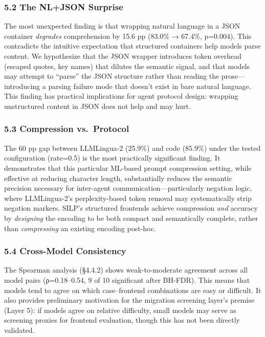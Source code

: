 \subsubsection{5.2 The NL+JSON Surprise}\label{the-nljson-surprise}



The most unexpected finding is that wrapping natural language in a JSON container \emph{degrades} comprehension by 15.6 pp (83.0\% → 67.4\%, p=0.004). This contradicts the intuitive expectation that structured containers help models parse content. We hypothesize that the JSON wrapper introduces token overhead (escaped quotes, key names) that dilutes the semantic signal, and that models may attempt to ``parse'' the JSON structure rather than reading the prose---introducing a parsing failure mode that doesn't exist in bare natural language. This finding has practical implications for agent protocol design: wrapping unstructured content in JSON does not help and may hurt.



\subsubsection{5.3 Compression vs.~Protocol}\label{compression-vs.-protocol}



The 60 pp gap between LLMLingua-2 (25.9\%) and code (85.9\%) under the tested configuration (rate=0.5) is the most practically significant finding. It demonstrates that this particular ML-based prompt compression setting, while effective at reducing character length, substantially reduces the semantic precision necessary for inter-agent communication---particularly negation logic, where LLMLingua-2's perplexity-based token removal may systematically strip negation markers. SILP's structured frontends achieve compression \emph{and} accuracy by \emph{designing} the encoding to be both compact and semantically complete, rather than \emph{compressing} an existing encoding post-hoc.



\subsubsection{5.4 Cross-Model Consistency}\label{cross-model-consistency}



The Spearman analysis (§4.4.2) shows weak-to-moderate agreement across all model pairs (ρ=0.18--0.54, 9 of 10 significant after BH-FDR). This means that models tend to agree on which case--frontend combinations are easy or difficult. It also provides preliminary motivation for the migration screening layer's premise (Layer 5): if models agree on relative difficulty, small models may serve as screening proxies for frontend evaluation, though this has not been directly validated.



